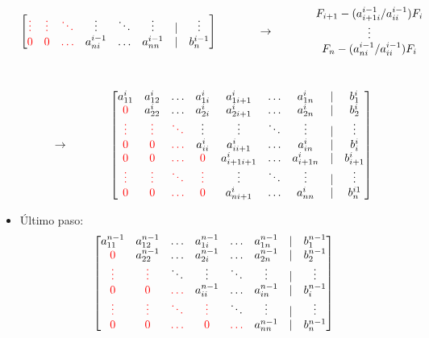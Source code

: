 \begin{itemize}
\[\begin{bmatrix}
    \textcolor{red}{\vdots} & \textcolor{red}{\vdots} & \textcolor{red}{\ddots} & \vdots & \ddots & \vdots & | & \vdots \\
    \textcolor{red}{0} & \textcolor{red}{0} & \textcolor{red}{\ldots} & a_{ni}^{i-1} & \ldots & a_{nn}^{i-1} & | & b_{n}^{i-1}
    \end{bmatrix}
    ~~~~~~~~~~~
    \to
    ~~~~~~~~~~~
    \begin{matrix}
    F_{i+1} - (a_{i+1i}^{i-1}/a_{ii}^{i-1})F_i \\
    \vdots \\
    F_n - (a_{ni}^{i-1}/a_{ii}^{i-1})F_i
    \end{matrix}
    \]
    
    \    
    \[
    \to
    ~~~~~~~~~~~
    \begin{bmatrix}
    a_{11}^{i} & a_{12}^{i} & \ldots & a_{1i}^{i} & a_{1i+1}^{i} & \ldots & a_{1n}^{i} & | & b_{1}^{i} \\
    \textcolor{red}{0} & a_{22}^{i} & \ldots & a_{2i}^{i} & a_{2i+1}^{i} & \ldots  & a_{2n}^{i} & | & b_{2}^{i} \\
    \textcolor{red}{\vdots} & \textcolor{red}{\vdots} & \textcolor{red}{\ddots} & \vdots & \vdots & \ddots  & \vdots & | & \vdots \\
    \textcolor{red}{0} & \textcolor{red}{0} & \textcolor{red}{\ldots} & a_{ii}^{i} & a_{ii+1}^{i} & \ldots & a_{in}^{i} & | & b_{i}^{i} \\
    \textcolor{red}{0} & \textcolor{red}{0} & \textcolor{red}{\ldots} & \textcolor{red}{0}& a_{i+1i+1}^{i} & \ldots & a_{i+1n}^{i} & | & b_{i+1}^{i} \\
    \textcolor{red}{\vdots} & \textcolor{red}{\vdots} & \textcolor{red}{\ddots} & \textcolor{red}{\vdots}& \vdots & \ddots & \vdots & | & \vdots \\
    \textcolor{red}{0} & \textcolor{red}{0} & \textcolor{red}{\ldots} & \textcolor{red}{0} & a_{ni+1}^{i} & \ldots & a_{nn}^{i} & | & b_{n}^{i1}
    \end{bmatrix}
    \]
    
    \item Último paso:
    \[
    \begin{bmatrix}
    a_{11}^{n-1} & a_{12}^{n-1} & \ldots & a_{1i}^{n-1} & \ldots & a_{1n}^{n-1} & | & b_{1}^{n-1} \\
    \textcolor{red}{0} & a_{22}^{n-1} & \ldots & a_{2i}^{n-1} & \ldots  & a_{2n}^{n-1} & | & b_{2}^{n-1} \\
    \textcolor{red}{\vdots} & \textcolor{red}{\vdots} & \ddots & \vdots & \ddots & \vdots & | & \vdots \\
    \textcolor{red}{0} & \textcolor{red}{0} & \textcolor{red}{\ldots} & a_{ii}^{n-1} & \ldots & a_{in}^{n-1} & | & b_{i}^{n-1} \\
    \textcolor{red}{\vdots} & \textcolor{red}{\vdots} & \textcolor{red}{\ddots} & \textcolor{red}{\vdots}& \ddots & \vdots & | & \vdots \\
    \textcolor{red}{0} & \textcolor{red}{0} & \textcolor{red}{\ldots} & \textcolor{red}{0} & \textcolor{red}{\ldots} & a_{nn}^{n-1} & | & b_{n}^{n-1}
    \end{bmatrix}
    \]
\end{itemize}

